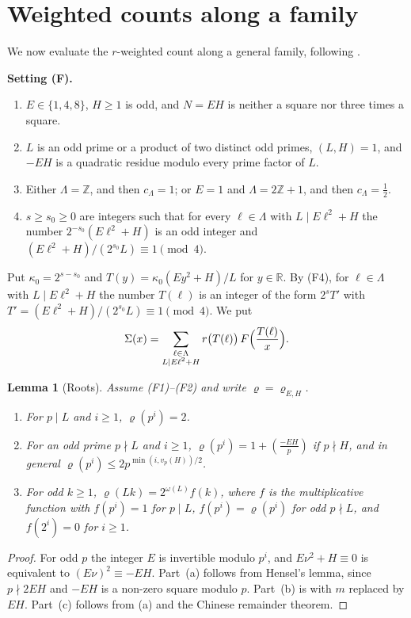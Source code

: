 \documentclass[11pt]{amsart}
\newtheorem{lemma}[theorem]{Lemma}
\theoremstyle{remark}
\theoremstyle{definition}
\numberwithin{equation}{section}
\newcommand{\Z}{\mathbb{Z}}
\newcommand{\R}{\mathbb{R}}
\newcommand{\leg}[2]{\left(\frac{#1}{#2}\right)}
\begin{document}
\section{Weighted counts along a family}\label{sec:counts}

We now evaluate the $r$-weighted count along a general family, following \cite[\S\S5,7]{IC}.

\medskip
\noindent\textbf{Setting (F).}
\begin{enumerate}
\item[(F1)] $E\in\{1,4,8\}$, $H\ge1$ is odd, and $N=EH$ is neither a square nor three times a square.
\item[(F2)] $L$ is an odd prime or a product of two distinct odd primes, $(L,H)=1$, and $-EH$ is a quadratic residue modulo every prime factor of $L$.
\item[(F3)] Either $\Lambda=\Z$, and then $c_\Lambda=1$; or $E=1$ and $\Lambda=2\Z+1$, and then $c_\Lambda=\frac12$.
\item[(F4)] $s\ge s_0\ge0$ are integers such that for every $\ell\in\Lambda$ with $L\mid E\ell^2+H$ the number $2^{-s_0}(E\ell^2+H)$ is an odd integer and $(E\ell^2+H)/(2^{s_0}L)\equiv1\pmod 4$.
\end{enumerate}
Put $\kappa_0=2^{s-s_0}$ and $T(y)=\kappa_0(Ey^2+H)/L$ for $y\in\R$. By (F4), for $\ell\in\Lambda$ with $L\mid E\ell^2+H$ the number $T(\ell)$ is an integer of the form $2^sT'$ with $T'=(E\ell^2+H)/(2^{s_0}L)\equiv1\pmod4$. We put
\[
\Sigma(x)=\sum_{\substack{\ell\in\Lambda\\ L\mid E\ell^2+H}}r\bigl(T(\ell)\bigr)\,F\Bigl(\frac{T(\ell)}x\Bigr).
\]

\begin{lemma}[Roots]\label{lem:roots}
Assume \textup{(F1)}--\textup{(F2)} and write $\varrho=\varrho_{E,H}$.
\begin{enumerate}
\item[(a)] For $p\mid L$ and $i\ge1$, $\varrho(p^i)=2$.
\item[(b)] For an odd prime $p\nmid L$ and $i\ge1$, $\varrho(p^i)=1+\leg{-EH}p$ if $p\nmid H$, and in general $\varrho(p^i)\le2p^{\min(i,v_p(H))/2}$.
\item[(c)] For odd $k\ge1$, $\varrho(Lk)=2^{\omega(L)}f(k)$, where $f$ is the multiplicative function with $f(p^i)=1$ for $p\mid L$, $f(p^i)=\varrho(p^i)$ for odd $p\nmid L$, and $f(2^i)=0$ for $i\ge1$.
\end{enumerate}
\end{lemma}

\begin{proof}
For odd $p$ the integer $E$ is invertible modulo $p^i$, and $E\nu^2+H\equiv0$ is equivalent to $(E\nu)^2\equiv-EH$. Part~(a) follows from Hensel's lemma, since $p\nmid2EH$ and $-EH$ is a non-zero square modulo $p$. Part~(b) is \cite[Lemma~5.2(b)]{IC} with $m$ replaced by $EH$. Part~(c) follows from (a) and the Chinese remainder theorem.
\end{proof}
\end{document}
